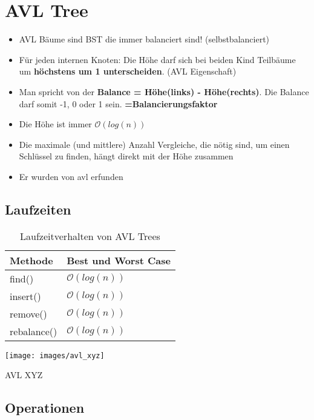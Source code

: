 \section{AVL Tree}
\begin{itemize}
	\item AVL Bäume sind BST die immer balanciert sind! (selbstbalanciert)
	\item Für jeden internen Knoten: Die Höhe darf sich bei beiden Kind Teilbäume um \textbf{höchstens um 1 unterscheiden}. (AVL Eigenschaft)
	\item Man spricht von der \textbf{Balance = Höhe(links) - Höhe(rechts)}. Die Balance darf somit -1, 0 oder 1 sein. \textbf{=Balancierungsfaktor}
	\item Die Höhe ist immer $\mathcal{O}(log(n))$
	\item Die maximale (und mittlere) Anzahl Vergleiche, die nötig sind, um einen Schlüssel zu finden, hängt direkt mit der Höhe zusammen
	\item Er wurden von \gls{avl} erfunden
\end{itemize}

\subsection{Laufzeiten}
\begin{table}[h]
	\centering
	\begin{tabu} to \linewidth {l l}
		\toprule
		Methode & Best und Worst Case \\
		\midrule
		find() & $\mathcal{O}(log(n))$   \\
		insert() & $\mathcal{O}(log(n))$ \\
		remove() & $\mathcal{O}(log(n))$ \\
		rebalance() & $\mathcal{O}(log(n))$   \\
		\bottomrule
	\end{tabu}
	\caption{Laufzeitverhalten von AVL Trees}
\end{table}

\begin{minipage}[t]{0.4\textwidth}
				\centering
				\texttt{[image: images/avl\_xyz]}
				\caption{AVL XYZ}
				\label{fig:AVL_XYZ}
			\end{minipage}
\clearpage

\subsection{Operationen}
